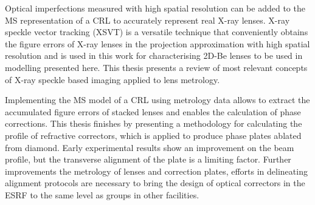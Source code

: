 Optical imperfections measured with high spatial resolution can be added to the MS representation of a CRL to accurately represent real X-ray lenses. X-ray speckle vector tracking (XSVT) is a versatile technique that conveniently obtains the figure errors of X-ray lenses in the projection approximation with high spatial resolution and is used in this work for characterising 2D-Be lenses to be used in modelling presented here. This thesis presents a review of most relevant concepts of X-ray speckle based imaging applied to lens metrology.

Implementing the MS model of a CRL using metrology data allows to extract the accumulated figure errors of stacked lenses and enables the calculation of phase corrections. This thesis finishes by presenting a methodology for calculating the profile of refractive correctors, which is applied to produce phase plates ablated from diamond. Early experimental results show an improvement on the beam profile, but the transverse alignment of the plate is a limiting factor. Further improvements the metrology of lenses and correction plates, efforts in delineating alignment protocols are necessary to bring the design of optical correctors in the ESRF to the same level as groups in other facilities.